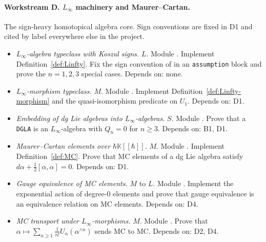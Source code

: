 \documentclass[11pt,a4paper]{article}
\theoremstyle{definition}
\newcommand{\K}{\mathbb{K}}
\newcommand{\defi}[1]{\emph{#1}}
\begin{document}
\paragraph{Workstream D. $L_\infty$ machinery and Maurer--Cartan.}
The sign-heavy homotopical algebra core. Sign conventions are fixed
in D1 and cited by label everywhere else in the project.
\begin{itemize}[leftmargin=2em]
  \item[\textbf{D1}]
    \defi{$L_\infty$-algebra typeclass with Koszul signs.} $L$.
    Module . Implement
    Definition~\ref{def:Linfty}. Fix the sign convention of
    \cite[\S3.4]{Kontsevich2003} in an \texttt{assumption} block and
    prove the $n=1,2,3$ special cases. Depends on: none.
  \item[\textbf{D2}]
    \defi{$L_\infty$-morphism typeclass.} $M$. Module
    . Implement
    Definition~\ref{def:Linfty-morphism} and the
    quasi-isomorphism predicate on $U_{1}$. Depends on: D1.
  \item[\textbf{D3}]
    \defi{Embedding of dg Lie algebras into $L_\infty$-algebras.} $S$.
    Module . Prove that a
    \texttt{DGLA} is an $L_\infty$-algebra with $Q_{n} = 0$ for
    $n \ge 3$. Depends on: B1, D1.
  \item[\textbf{D4}]
    \defi{Maurer--Cartan elements over $\hbar \K[[\hbar]]$.} $M$.
    Module . Implement
    Definition~\ref{def:MC}. Prove that MC elements of a dg Lie
    algebra satisfy $d\alpha + \tfrac{1}{2}[\alpha,\alpha] = 0$.
    Depends on: D1.
  \item[\textbf{D5}]
    \defi{Gauge equivalence of MC elements.} $M$ to $L$. Module
    . Implement the exponential action
    of degree-$0$ elements and prove that gauge equivalence is an
    equivalence relation on MC elements. Depends on: D4.
  \item[\textbf{D6}]
    \defi{MC transport under $L_\infty$-morphisms.} $M$. Module
    . Prove that
    $\alpha \mapsto \sum_{n\ge 1} \tfrac{1}{n!} U_{n}(\alpha^{\wedge n})$
    sends MC to MC. Depends on: D2, D4.
\end{itemize}
\end{document}
